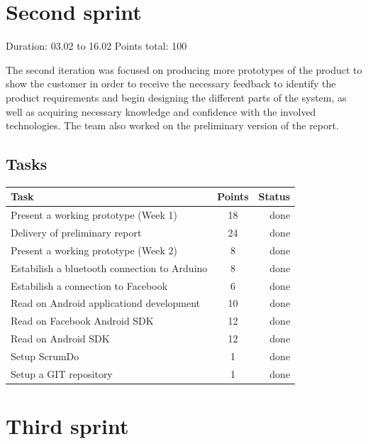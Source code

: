 \newpage


\section{Second sprint}

Duration: 03.02 to 16.02
Points total: 100

The second iteration was focused on producing more prototypes of the product to
show the customer in order to receive the necessary feedback to identify
the product requirements and begin designing the different parts of the system,
as well as acquiring necessary knowledge and confidence with the involved
technologies. The team also worked on the preliminary version of the report.

\subsection{Tasks}

\begin{table}[ht!]
\begin{tabular}{ | l | c | r | }

\hline
\textbf{Task} & \textbf{Points} & \textbf{Status} \\
\hline

Present a working prototype	(Week 1)			& 18 & done \\
\hline
Delivery of preliminary report					& 24 & done \\
\hline
Present a working prototype	(Week 2)			& 8  & done \\
\hline
Estabilish a bluetooth connection to Arduino	& 8  & done \\
\hline
Estabilish a connection to Facebook				& 6  & done \\
\hline
Read on Android applicationd development		& 10 & done \\
\hline
Read on Facebook Android SDK					& 12 & done \\
\hline
Read on Android SDK								& 12 & done \\
\hline
Setup ScrumDo									& 1  & done \\
\hline
Setup a GIT repository							& 1  & done \\
\hline

\end{tabular}
\end{table}


\newpage


\section{Third sprint}

